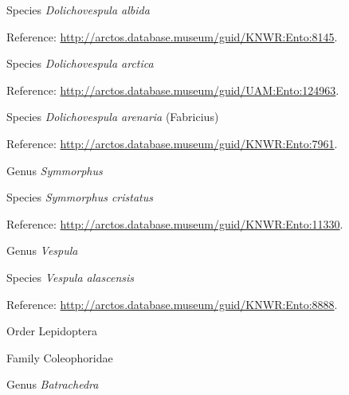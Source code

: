 \documentclass[9pt, article]{memoir}
\begin{document}
\begin{multicols}{2}
\vspace{6pt}\noindent\hspace{36pt}Species \textit{Dolichovespula albida}


\vspace{6pt}Reference: 
\url{http://arctos.database.museum/guid/KNWR:Ento:8145}.

\vspace{6pt}\noindent\hspace{36pt}Species \textit{Dolichovespula arctica}


\vspace{6pt}Reference: 
\url{http://arctos.database.museum/guid/UAM:Ento:124963}.

\vspace{6pt}\noindent\hspace{36pt}Species \textit{Dolichovespula arenaria} (Fabricius)


\vspace{6pt}Reference: 
\url{http://arctos.database.museum/guid/KNWR:Ento:7961}.

\vspace{6pt}\noindent\hspace{30pt}Genus \textit{Symmorphus}


\vspace{6pt}\noindent\hspace{36pt}Species \textit{Symmorphus cristatus}


\vspace{6pt}Reference: 
\url{http://arctos.database.museum/guid/KNWR:Ento:11330}.

\vspace{6pt}\noindent\hspace{30pt}Genus \textit{Vespula}


\vspace{6pt}\noindent\hspace{36pt}Species \textit{Vespula alascensis}


\vspace{6pt}Reference: 
\url{http://arctos.database.museum/guid/KNWR:Ento:8888}.

\vspace{6pt}\noindent\hspace{18pt}Order Lepidoptera


\vspace{6pt}\noindent\hspace{24pt}Family Coleophoridae


\vspace{6pt}\noindent\hspace{30pt}Genus \textit{Batrachedra}



\end{multicols}
\end{document}
